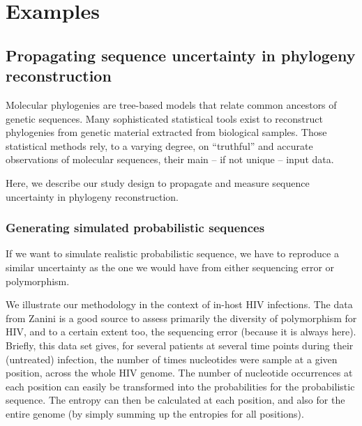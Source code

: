\documentclass[10pt]{article}
\begin{document}
\newpage

\section{Examples}
\subsection{Propagating sequence uncertainty in phylogeny reconstruction}

Molecular phylogenies are tree-based models that relate common ancestors of genetic sequences. Many sophisticated statistical tools exist to reconstruct phylogenies from genetic material extracted from biological samples. Those statistical methods rely, to a varying degree, on ``truthful'' and accurate observations of molecular sequences, their main -- if not unique -- input data.

Here, we describe our study design to propagate and measure sequence uncertainty in phylogeny reconstruction. 


\subsubsection{Generating simulated probabilistic sequences} 
\label{sec:zanini_poly}

If we want to simulate realistic probabilistic sequence, we have to reproduce a similar uncertainty as the one we would have from either sequencing error or polymorphism. 

We illustrate our methodology in the context of in-host HIV infections. 
The data from Zanini \cite{Zanini:2015} is a good source to assess primarily the diversity of polymorphism for HIV, and to a certain extent too, the sequencing error (because it is always here). 
Briefly, this data set gives, for several patients at several time points during their (untreated) infection, the number of times nucleotides were sample at a given position, across the whole HIV genome. 
The number of nucleotide occurrences at each position can easily be transformed into the probabilities for the probabilistic sequence. The entropy can then be calculated at each position, and also for the entire genome (by simply summing up the entropies for all positions). 
\end{document}
